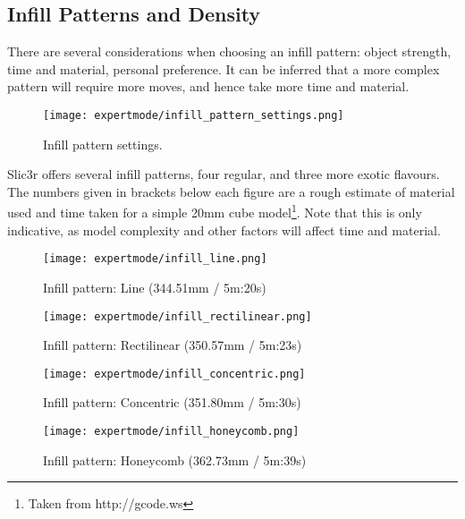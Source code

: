 
\subsection{Infill Patterns and Density} %
\label{sec:infill_patterns_and_density}

There are several considerations when choosing an infill pattern: object strength, time and material, personal preference.  It can be inferred that a more complex pattern will require more moves, and hence take more time and material.  

\begin{figure}[H]
\centering
\texttt{[image: expertmode/infill\_pattern\_settings.png]}
\caption{Infill pattern settings.}
\label{fig:infill_pattern_settings}
\end{figure}

Slic3r offers several infill patterns, four regular, and three more exotic flavours.  The numbers given in brackets below each figure are a rough estimate of material used and time taken for a simple 20mm cube model\footnote{Taken from http://gcode.ws}.  Note that this is only indicative, as model complexity and other factors will affect time and material.

\begin{figure}[H]
\centering
\texttt{[image: expertmode/infill\_line.png]}
\caption{Infill pattern: Line (344.51mm / 5m:20s)}
\label{fig:infill_line}
\end{figure}

\begin{figure}[H]
\centering
\texttt{[image: expertmode/infill\_rectilinear.png]}
\caption{Infill pattern: Rectilinear (350.57mm / 5m:23s)}
\label{fig:infill_rectilinear}
\end{figure}

\begin{figure}[H]
\centering
\texttt{[image: expertmode/infill\_concentric.png]}
\caption{Infill pattern: Concentric (351.80mm / 5m:30s)}
\label{fig:infill_concentric}
\end{figure}

\begin{figure}[H]
\centering
\texttt{[image: expertmode/infill\_honeycomb.png]}
\caption{Infill pattern: Honeycomb (362.73mm / 5m:39s)}
\label{fig:infill_honeycomb}
\end{figure}

